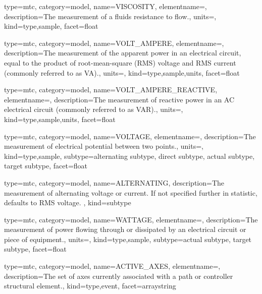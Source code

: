 {
  type=mtc,
  category=model,
  name={VISCOSITY},
  elementname=,
  description={The measurement of a fluids resistance to flow.},
  units=,
  kind={type,sample},
  facet={\gls{float}}
}


{
  type=mtc,
  category=model,
  name={VOLT\_AMPERE},
  elementname=,
  description={The measurement of the apparent power in an electrical circuit, equal to the product of root-mean-square (RMS) voltage and RMS current (commonly referred to as VA).},
  units=,
  kind={type,sample,units},
  facet={\gls{float}}
}


{
  type=mtc,
  category=model,
  name={VOLT\_AMPERE\_REACTIVE},
  elementname=,
  description={The measurement of reactive power in an AC electrical circuit (commonly referred to as VAR).},
  units=,
  kind={type,sample,units},
  facet={\gls{float}}
}


{
  type=mtc,
  category=model,
  name={VOLTAGE},
  elementname=,
  description={The measurement of electrical potential between two points.},
  units=,
  kind={type,sample},
  subtype={\gls{alternating subtype}, \gls{direct subtype}, \gls{actual subtype}, \gls{target subtype}},
  facet={\gls{float}}
}


{
  type=mtc,
  category=model,
  name={ALTERNATING},
  description={The measurement of alternating voltage or current.   If not specified further in statistic, defaults to RMS voltage. },
  kind={subtype}
}


{
  type=mtc,
  category=model,
  name={WATTAGE},
  elementname=,
  description={The measurement of power flowing through or dissipated by an electrical circuit or piece of equipment.},
  units=,
  kind={type,sample},
  subtype={\gls{actual subtype}, \gls{target subtype}},
  facet={\gls{float}}
}


{
  type=mtc,
  category=model,
  name={ACTIVE\_AXES},
  elementname=,
  description={The set of axes currently associated with a \gls{path} or \gls{controller} \gls{structural element}.},
  kind={type,event},
  facet={\gls{arraystring}}
}


